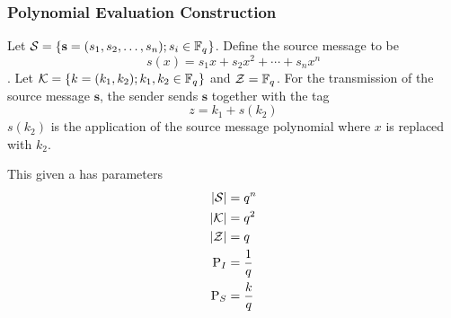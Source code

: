 \subsubsection{Polynomial Evaluation Construction}\label{subsubsec:Systematic_Authentication_Code-Polynomial_Evaluation}
Let $\operatorname{\mathcal{S}} = \lbrace \mathbf{s} = (s_{1}, s_{2}, \ldots, s_{n}); s_{i} \in \mathbb{F}_{q^{}} \rbrace$.
Define the source message  to be
\begin{equation*}
  s(x) = s_{1}x + s_{2}x^{2} + \cdots + s_{n}x^{n}
\end{equation*}.
Let $\operatorname{\mathcal{K}} = \lbrace k = (k_{1}, k_{2}); k_{1}, k_{2} \in \mathbb{F}_{q^{}} \rbrace$ and $\operatorname{\mathcal{Z}} = \mathbb{F}_{q^{}}$.
For the transmission of the source message $\mathbf{s}$, the sender sends $\mathbf{s}$ together with the tag
\begin{equation*}
  z = k_{1} + s(k_{2})
\end{equation*}
$s(k_{2})$ is the application of the source message polynomial where $x$ is replaced with $k_{2}$.

\begin{theorem}\label{thm:Systematic_Authentication_Code Parameters}
  This  given a  has parameters
  \begin{equation}\label{eq:Systematic_Authentication_Code Parameters}
    \begin{aligned}
      \lvert \operatorname{\mathcal{S}} \rvert &= q^{n} \\
      \lvert \operatorname{\mathcal{K}} \rvert &= q^{2} \\
      \lvert \operatorname{\mathcal{Z}} \rvert &= q \\
      \operatorname{\operatorname{P}}_{I} &= \frac{1}{q} \\
      \operatorname{\operatorname{P}}_{S} &= \frac{k}{q} \\
    \end{aligned}
  \end{equation}
\end{theorem}

